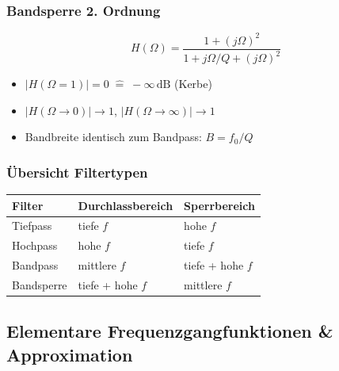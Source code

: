\documentclass[a4paper,12pt]{article}
\begin{document}
	
	\subsubsection{Bandsperre 2. Ordnung}
	\begin{equation}
		H(\Omega) = \frac{1 + (j\Omega)^2}{1 + j\Omega/Q + (j\Omega)^2}
	\end{equation}
	\begin{itemize}
		\item $|H(\Omega=1)| = 0 \;\widehat{=}\; -\infty\,\text{dB}$ (Kerbe)
		\item $|H(\Omega\to 0)| \to 1$, $|H(\Omega\to\infty)| \to 1$
		\item Bandbreite identisch zum Bandpass: $B = f_0/Q$
	\end{itemize}
	
	
	\subsubsection*{Übersicht Filtertypen}
	\begin{center}
		\begin{tabular}{lll}
			\hline
			Filter & Durchlassbereich & Sperrbereich \\
			\hline
			Tiefpass  & tiefe $f$          & hohe $f$            \\
			Hochpass  & hohe $f$           & tiefe $f$           \\
			Bandpass  & mittlere $f$       & tiefe + hohe $f$    \\
			Bandsperre& tiefe + hohe $f$   & mittlere $f$        \\
			\hline
		\end{tabular}
	\end{center}
	
	\subsection{Elementare Frequenzgangfunktionen \& Approximation}
	
\end{document}
